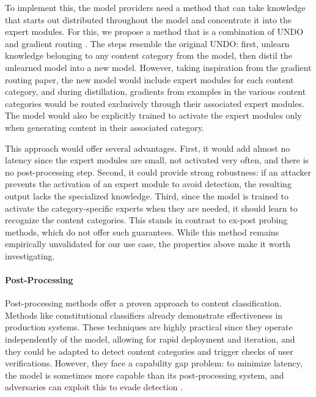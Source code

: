 \documentclass{article}
\theoremstyle{plain}
\theoremstyle{definition}
\theoremstyle{remark}
\begin{document}
To implement this, the model providers need a method that can take knowledge that starts out distributed throughout the model and concentrate it into the expert modules.
For this, we propose a method that is a combination of UNDO \cite{lee2025distillationrobustifiesunlearning} and gradient routing \cite{cloud2024gradientroutingmaskinggradients}.
The steps resemble the original UNDO: first, unlearn knowledge belonging to any content category from the model, then distil the unlearned model into a new model.
However, taking inspiration from the gradient routing paper, the new model would include expert modules for each content category, and during distillation, gradients from examples in the various content categories would be routed exclusively through their associated expert modules.
The model would also be explicitly trained to activate the expert modules only when generating content in their associated category.

This approach would offer several advantages.
First, it would add almost no latency since the expert modules are small, not activated very often, and there is no post-processing step.
Second, it could provide strong robustness: if an attacker prevents the activation of an expert module to avoid detection, the resulting output lacks the specialized knowledge.
Third, since the model is trained to activate the category-specific experts when they are needed, it should learn to recognize the content categories.
This stands in contrast to ex-post probing methods, which do not offer such guarantees.
While this method remains empirically unvalidated for our use case, the properties above make it worth investigating.

\paragraph{Post-Processing}

Post-processing methods offer a proven approach to content classification.
Methods like constitutional classifiers \cite{sharma2025constitutionalclassifiersdefendinguniversal} already demonstrate effectiveness in production systems.
These techniques are highly practical since they operate independently of the model, allowing for rapid deployment and iteration, and they could be adapted to detect content categories and trigger checks of user verifications.
However, they face a capability gap problem: to minimize latency, the model is sometimes more capable than its post-processing system, and adversaries can exploit this to evade detection \cite{jin2024jailbreakinglargelanguagemodels, kumar2025freelunchguardrails}.
\end{document}
